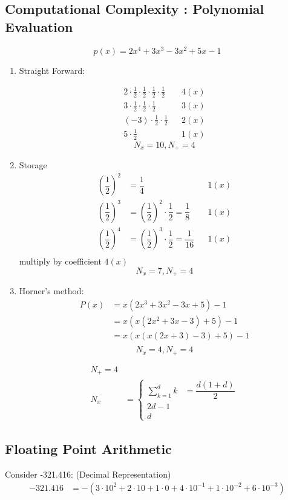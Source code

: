 \documentclass[10pt]{article}
\theoremstyle{definition}
\begin{document}
 \subsection{Computational Complexity : Polynomial Evaluation}
 
 \[p(x) = 2x^4+3x^3-3x^2+5x-1\]
 \begin{enumerate}
 \item Straight Forward:
 
 \begin{align*}
 2 \cdot \frac{1}{2} \cdot  \frac{1}{2} \cdot  \frac{1}{2} \cdot  \frac{1}{2} && 4(x)\\
 3 \cdot  \frac{1}{2} \cdot  \frac{1}{2} \cdot  \frac{1}{2} && 3(x)\\
  (-3)\cdot  \frac{1}{2} \cdot  \frac{1}{2} && 2(x)\\
  5\cdot \frac{1}{2} &&1(x)
 \end{align*}
 $$N_x = 10 ,N_+=4$$
 \item Storage
 \begin{align*}
 \left(\dfrac{1}{2}\right)^2 &=\dfrac{1}{4} &&1(x)\\
   \left(\dfrac{1}{2}\right)^3 &= \left(\dfrac{1}{2}\right)^2\cdot \dfrac{1}{2} = \dfrac{1}{8} &&1(x)\\
   \left(\dfrac{1}{2}\right)^4 &=\left(\dfrac{1}{2}\right)^3\cdot \dfrac{1}{2} = \dfrac{1}{16} &&1(x)\\
 \end{align*}
 multiply by coefficient $4(x)$\\
 $$N_x = 7, N_+=4$$
 \item Horner's method:
 \begin{align*}
 P(x)&=x(2x^3+3x^2-3x+5)-1\\
 &=x(x(2x^2+3x-3)+5)-1\\
  &=x(x(x(2x+3)-3)+5)-1\\
 \end{align*}
 $$N_x = 4 , N_+=4$$
 
\begin{align*}
N_+ =4\\
N_x &=\begin{cases}
\sum_{k=1}^d k &=\dfrac{d(1+d)}{2}\\
2d - 1\\
d
\end{cases}
\end{align*}
 \end{enumerate}
   \subsection{Floating Point Arithmetic}
   Consider -321.416: (Decimal Representation)
   \begin{align*}
   -321.416&=-(3\cdot 10^2 + 2\cdot 10 +1\cdot 0 + 4\cdot 10^{-1}+1\cdot 10^{-2}+6\cdot 10^{-3})
   \end{align*}
   
\end{document}
